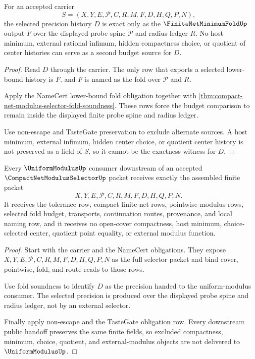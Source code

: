 \begin{theorem}
\label{thm:compact-net-modulus-selector-finite-fold-budget-exactness}
For an accepted carrier
$$
S=(X,Y,E,\mathcal{P},C,R,M,F,D,H,Q,P,N),
$$
the selected precision history $D$ is exact only as the $\FiniteNetMinimumFoldUp$ output $F$ over the displayed probe spine $\mathcal{P}$ and radius ledger $R$. No host minimum, external rational infimum, hidden compactness choice, or quotient of center histories can serve as a second budget source for $D$.
\end{theorem}
\begin{proof}
Read $D$ through the carrier. The only row that exports a selected lower-bound history is $F$, and $F$ is named as the fold over $\mathcal{P}$ and $R$.

Apply the NameCert lower-bound fold obligation together with \autoref{thm:compact-net-modulus-selector-fold-soundness}. These rows force the budget comparison to remain inside the displayed finite probe spine and radius ledger.

Use non-escape and TasteGate preservation to exclude alternate sources. A host minimum, external infimum, hidden center choice, or quotient center history is not preserved as a field of $S$, so it cannot be the exactness witness for $D$.
\end{proof}

\begin{theorem}
\label{thm:compact-net-modulus-selector-uniform-modulus-public-handoff}
Every $\UniformModulusUp$ consumer downstream of an accepted $\CompactNetModulusSelectorUp$ packet receives exactly the assembled finite packet
$$
X,Y,E,\mathcal{P},C,R,M,F,D,H,Q,P,N.
$$
It receives the tolerance row, compact finite-net rows, pointwise-modulus rows, selected fold budget, transports, continuation routes, provenance, and local naming row, and it receives no open-cover compactness, host minimum, choice-selected center, quotient point equality, or external modulus function.
\end{theorem}
\begin{proof}
Start with the carrier and the NameCert obligations. They expose $X,Y,E,\mathcal{P},C,R,M,F,D,H,Q,P,N$ as the full selector packet and bind cover, pointwise, fold, and route reads to those rows.

Use fold soundness to identify $D$ as the precision handed to the uniform-modulus consumer. The selected precision is produced over the displayed probe spine and radius ledger, not by an external selector.

Finally apply non-escape and the TasteGate obligation row. Every downstream public handoff preserves the same finite fields, so excluded compactness, minimum, choice, quotient, and external-modulus objects are not delivered to $\UniformModulusUp$.
\end{proof}


